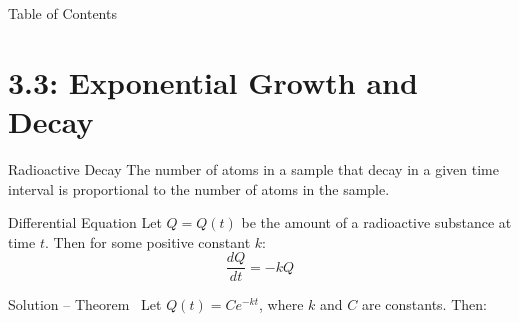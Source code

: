 

\begin{frame}{Table of Contents}
\mapofcontentsC{\cc}
\end{frame}
\section*{3.3: Exponential Growth and Decay}
\begin{frame}[t]{Radioactive Decay}
The number of atoms in a sample that decay in a given time interval is proportional to the number of atoms in the sample.
\pause
\begin{block}{Differential Equation}
Let $Q=Q(t)$ be the amount of a radioactive substance at time $t$. Then for some positive constant $k$:
\[\frac{dQ}{dt} = -kQ\]
\end{block}\pause
\begin{block}{Solution -- Theorem~}
Let $\boxed{Q(t)=Ce^{-kt}}$, where $k$ and $C$ are constants. Then:\pause
\answer{\[\alert{\frac{dQ}{dt}(t)}=C\cdot e^{{-kt}} \cdot (-k)=-kCe^{-kt}=\alert{-kQ(t)}\]}
\end{block}

\end{frame}

